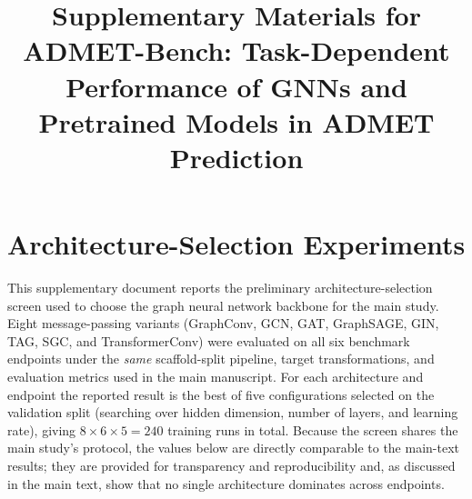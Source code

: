 \documentclass[journal,onecolumn]{IEEEtran}
\begin{document}
\title{Supplementary Materials for\\
ADMET-Bench: Task-Dependent Performance of GNNs and Pretrained Models in ADMET Prediction}

\author{}

\maketitle

\renewcommand{\thetable}{S\arabic{table}}
\renewcommand{\thefigure}{S\arabic{figure}}

\section{Architecture-Selection Experiments}
\label{sec:supp_architecture}

This supplementary document reports the preliminary architecture-selection screen used to choose the graph neural network backbone for the main study. Eight message-passing variants (GraphConv, GCN, GAT, GraphSAGE, GIN, TAG, SGC, and TransformerConv) were evaluated on all six benchmark endpoints under the \emph{same} scaffold-split pipeline, target transformations, and evaluation metrics used in the main manuscript. For each architecture and endpoint the reported result is the best of five configurations selected on the validation split (searching over hidden dimension, number of layers, and learning rate), giving $8 \times 6 \times 5 = 240$ training runs in total. Because the screen shares the main study's protocol, the values below are directly comparable to the main-text results; they are provided for transparency and reproducibility and, as discussed in the main text, show that no single architecture dominates across endpoints.
\end{document}
